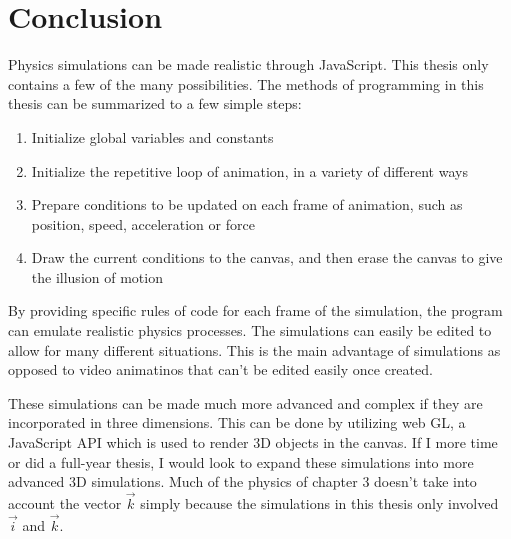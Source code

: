 
\chapter{Conclusion} %

\label{Conclusion} %



Physics simulations can be made realistic through JavaScript.  This thesis only contains a few of the many possibilities.  The methods of programming in this thesis can be summarized to a few simple steps:

\begin{enumerate}  
\item Initialize global variables and constants
\item Initialize the repetitive loop of animation, in a variety of different ways
\item Prepare conditions to be updated on each frame of animation, such as position, speed, acceleration or force
\item Draw the current conditions to the canvas, and then erase the canvas to give the illusion of motion
\end{enumerate} 

By providing specific rules of code for each frame of the simulation, the program can emulate realistic physics processes.  The simulations can easily be edited to allow for many different situations.  This is the main advantage of simulations as opposed to video animatinos that can't be edited easily once created.     


These simulations can be made much more advanced and complex if they are incorporated in three dimensions.  This can be done by utilizing web GL, a JavaScript API which is used to render 3D objects in the canvas.  If I more time or did a full-year thesis, I would look to expand these simulations into more advanced 3D simulations.  Much of the physics of chapter 3 doesn't take into account the vector $\vec{k}$ simply because the simulations in this thesis only involved $\vec{i}$ and $\vec{k}$.  


